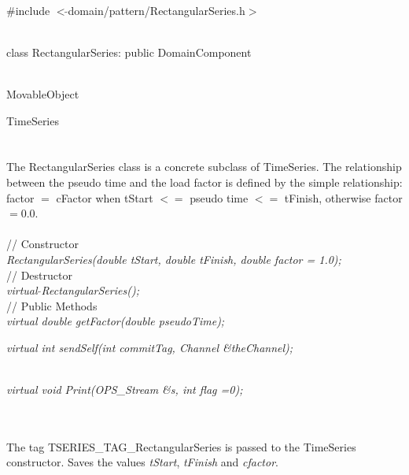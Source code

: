 
   \\
\#include $<\tilde{ }$domain/pattern/RectangularSeries.h$>$  


  \\
class RectangularSeries: public DomainComponent  


 \\
MovableObject 

\indent\indent TimeSeries \\
\indent\indent{} \\

 \\ 
\indent The RectangularSeries class is a concrete subclass of TimeSeries.
The relationship between the pseudo time and the load factor is
defined by the simple relationship: factor $=$ cFactor when tStart $<=$
pseudo time $<=$ tFinish, otherwise factor $ =0.0$. \\


 \\
\indent // Constructor \\ 
{\em RectangularSeries(double tStart, double tFinish, double factor = 1.0);}\\ 

\indent // Destructor \\ 
{\em virtual $\tilde{ }$RectangularSeries();}\\  

\indent // Public Methods \\ 
{\em  virtual double getFactor(double pseudoTime);}

{\em  virtual int sendSelf(int commitTag, Channel \&theChannel);}

\\
{\em  virtual void Print(OPS_Stream \&s, int flag =0);}


 \\ 
\\ 
The tag TSERIES\_TAG\_RectangularSeries is passed to the TimeSeries
constructor. Saves the values {\em tStart}, {\em tFinish} and {\em
cfactor}. \\


